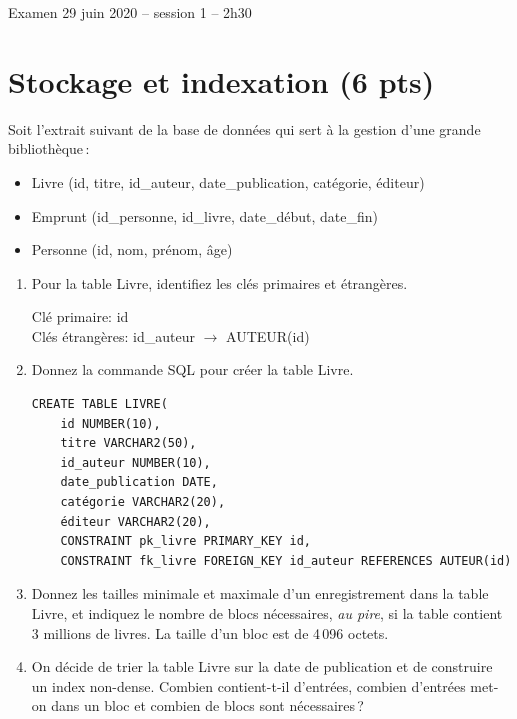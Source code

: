 
%
{Examen 29 juin 2020 -- session 1 -- 2h30}%
{\empty}%

\section{Stockage et indexation (6 pts)}

Soit l'extrait suivant de la base de données qui sert à la gestion d'une grande
 bibliothèque\,:

\begin{itemize}
  \item Livre (id, titre, id\_auteur, date\_publication, catégorie, éditeur)
  \item Emprunt (id\_personne, id\_livre, date\_début, date\_fin)
  \item Personne  (id, nom, prénom, âge)
\end{itemize}

\begin{enumerate}

\item Pour la table Livre, identifiez les clés primaires et étrangères.
\begin{solution}
Clé primaire: id\\
Clés étrangères: id\_auteur $\rightarrow$ AUTEUR(id)
\end{solution}

\item Donnez la commande SQL pour créer la table Livre. 
\begin{solution}
\begin{verbatim}
CREATE TABLE LIVRE(
    id NUMBER(10),
    titre VARCHAR2(50),
    id_auteur NUMBER(10),
    date_publication DATE,
    catégorie VARCHAR2(20),
    éditeur VARCHAR2(20),
    CONSTRAINT pk_livre PRIMARY_KEY id,
    CONSTRAINT fk_livre FOREIGN_KEY id_auteur REFERENCES AUTEUR(id)
\end{verbatim}
\end{solution}

\item Donnez les tailles minimale et maximale d'un enregistrement dans la table Livre, 
    et indiquez le nombre de blocs nécessaires, \emph{au pire}, si la table 
       contient 3 millions de livres. La taille d'un bloc est de 4\,096 octets.
       
 \item On décide de trier la table Livre sur la date de publication et de construire
     un index non-dense. Combien contient-t-il d'entrées, combien d'entrées met-on dans
     un bloc et combien de blocs sont nécessaires\,?
\end{enumerate}

